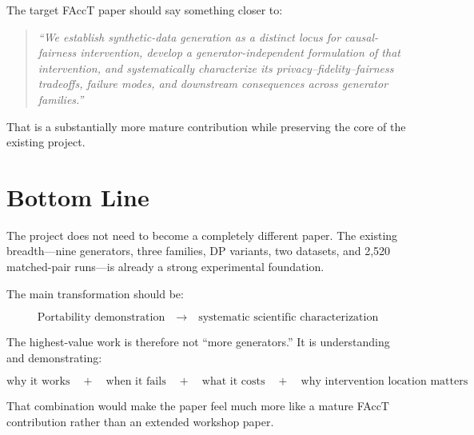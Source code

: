 \documentclass[11pt]{article}
\begin{document}
The target FAccT paper should say something closer to:

\begin{quote}
\emph{``We establish synthetic-data generation as a distinct locus for causal-fairness intervention, develop a generator-independent formulation of that intervention, and systematically characterize its privacy--fidelity--fairness tradeoffs, failure modes, and downstream consequences across generator families.''}
\end{quote}

That is a substantially more mature contribution while preserving the core of the existing project.

\section*{Bottom Line}

The project does not need to become a completely different paper. The existing breadth---nine generators, three families, DP variants, two datasets, and 2,520 matched-pair runs---is already a strong experimental foundation.

The main transformation should be:

\[
\boxed{
\text{Portability demonstration}
\quad\longrightarrow\quad
\text{systematic scientific characterization}
}
\]

The highest-value work is therefore not ``more generators.'' It is understanding and demonstrating:

\[
\boxed{
\text{why it works}
\quad+\quad
\text{when it fails}
\quad+\quad
\text{what it costs}
\quad+\quad
\text{why intervention location matters}
}
\]

That combination would make the paper feel much more like a mature FAccT contribution rather than an extended workshop paper.
\end{document}
